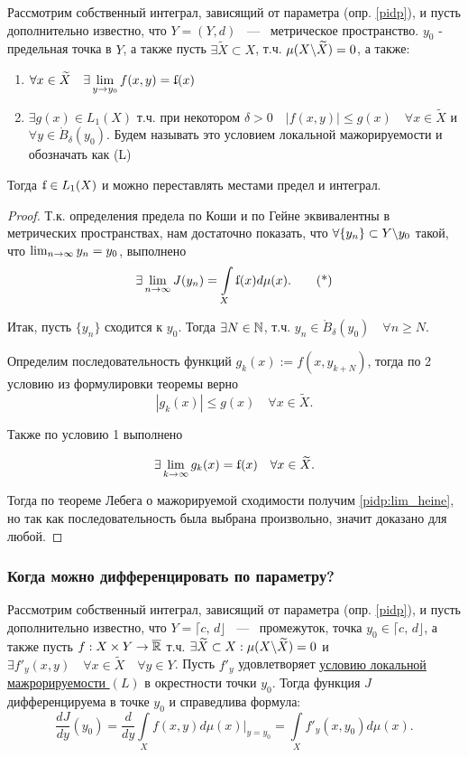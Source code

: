 \theorem Рассмотрим собственный интеграл, зависящий от параметра (опр. \ref{pidp}), и пусть дополнительно известно, что $Y = (Y, d)$ ~---~ метрическое пространство. $y_0$ - предельная точка в $Y$, а также пусть $\exists \widetilde{X} \subset X$, т.ч. $\mu(X \backslash \widetilde{X}) = 0$, а также:
\begin{enumerate}
    \item $\forall x \in \widetilde{X} \quad \exists \lim\limits_{y \ra y_0} f(x, y) = \ff(x)$
    \item $\exists g(x) \in L_1(X)$ т.ч. при некотором $\delta > 0 \quad \left| f(x,y)\right| \leq g(x) \quad \forall x \in \widetilde{X}$ и $\forall y \in \mathring{B}_\delta(y_0)$. Будем называть это условием локальной мажорируемости и обозначать как (L) \label{def:loc_maj}
\end{enumerate}


Тогда $\ff \in L_1(X)$ и можно переставлять местами предел и интеграл.

\begin{proof}
	Т.к. определения предела по Коши и по Гейне эквивалентны в метрических пространствах, нам достаточно показать, что $\forall \{y_n\} \subset Y \backslash y_0$ такой, что $\lim_{n \rightarrow \infty} y_n = y_0$, выполнено \[
	\exists \lim\limits_{n \ra \infty} J(y_n) = \int\limits_{X} \ff(x) d\mu(x). \tag{*}
	\label{pidp:lim_heine}
	\]

	Итак, пусть $\{y_n\}$ сходится к $y_0$. Тогда $\exists N \in \mathbb{N}$, т.ч. $y_n \in \mathring{B}_\delta(y_0) \quad \forall n \geq N$.

	Определим последовательность функций $g_k(x) := f(x, y_{k + N})$, тогда по 2 условию из формулировки теоремы верно
	$$\left| g_k(x) \right| \leq g(x) \quad \forall x \in \widetilde{X}.$$

	Также по условию 1 выполнено

	$$\exists \lim\limits_{k \ra \infty}g_k(x) = \ff(x) \quad \forall x \in \widetilde{X}.$$

	Тогда по теореме Лебега о мажорируемой сходимости получим \eqref{pidp:lim_heine}, но так как последовательность была выбрана произвольно, значит доказано для любой.
\end{proof}

\subsubsection{Когда можно дифференцировать по параметру?}

\theorem Рассмотрим собственный интеграл, зависящий от параметра (опр. \ref{pidp}), и пусть дополнительно известно, что $Y = \lceil c, \, d\rfloor$ ~---~ промежуток, точка $y_0 \in \lceil c, \, d\rfloor$, а также пусть $f : X \times Y \rightarrow \overline{\mathbb{R}}$ т.ч. $\exists \widetilde{X} \subset X : \mu(X \backslash \widetilde{X}) = 0$ и $\exists f'_y(x, y) \quad \forall x \in \widetilde{X} \quad \forall y \in Y$. Пусть $f'_y$ удовлетворяет \hyperref[def:loc_maj]{условию локальной мажрорируемости $(L)$} в окрестности точки $y_0$. Тогда функция $J$ дифференцируема в точке $y_0$ и справедлива формула:
$$\frac{d J}{d y}(y_0) = \frac{d}{d y} \int\limits_X f(x, y) d \mu(x) \Bigg|_{y=y_0} = \int\limits_X f'_y(x, y_0) d \mu(x).$$

